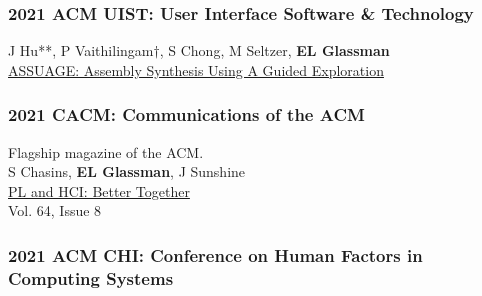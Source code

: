\documentclass[10pt, a4paper]{article}
\newcommand{\years}[1]{\marginnote{\normalsize #1}}
\begin{document}
\subsubsection*{2021 ACM \textbf{UIST}: User Interface Software \& Technology}

\years{\textbf{C21}}J Hu**, P Vaithilingam$\dagger$, S Chong, M Seltzer, \textbf{EL Glassman}\\
\href{http://glassmanlab.seas.harvard.edu/papers/ASSUAGE_UIST21.pdf}{ASSUAGE: Assembly Synthesis Using A Guided Exploration}

\subsubsection*{2021 \textbf{CACM}: Communications of the ACM}
Flagship magazine of the ACM.\\%

\years{\textbf{M1}}S Chasins, \textbf{EL Glassman}, J Sunshine\\
\href{http://glassmanlab.seas.harvard.edu/papers/PLandHCI_betterTogether.pdf}{PL and HCI: Better Together}\\
Vol. 64, Issue 8

\subsubsection*{2021 ACM \textbf{CHI}: Conference on Human Factors in Computing Systems}
\end{document}
